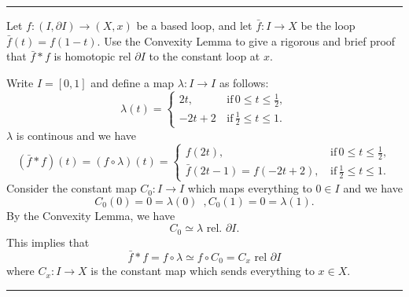 \documentclass[a4paper, 12pt]{article}
\begin{document}
\noindent\rule{7in}{2.8pt}

\begin{problem}{2}
Let \(f:(I,\partial I)\rightarrow (X,x)\) be a based loop, and let \(\bar{f}:I\rightarrow X\) be the loop \(\bar{f}(t)=f(1-t)\). Use the Convexity Lemma to give a rigorous and brief proof that 
\(\bar{f}*f\) is homotopic rel \(\partial I\) to the constant loop at \(x\).
\end{problem}
\begin{solution}
Write \(I=[0,1]\) and define a map \(\lambda:I\rightarrow I\) as follows:
\[\lambda(t)=\begin{cases}
    2t,&\, \text{if}\, 0\leq t\leq \frac{1}{2},\\ 
    -2t+2&\, \text{if}\, \frac{1}{2}\leq t\leq 1.
\end{cases}\]
\(\lambda\) is continous and we have
\[(\bar{f}*f)(t)=(f\circ \lambda)(t)=\begin{cases}
    f(2t),&\, \text{if}\, 0\leq t\leq \frac{1}{2},\\ 
    \bar{f}(2t-1)=f(-2t+2),&\, \text{if}\, \frac{1}{2}\leq t\leq 1.
\end{cases}\]
Consider the constant map \(C_0:I\rightarrow I\) which maps everything to \(0\in I\) and we have 
\[C_0(0)=0=\lambda(0)\,\,\, ,C_0(1)=0=\lambda(1).\]
By the Convexity Lemma, we have 
\[C_0\simeq \lambda\,\, \text{rel.}\,\, \partial I.\]
This implies that 
\[\bar{f}*f=f\circ \lambda\simeq f\circ C_0=C_x\,\, \text{rel}\,\, \partial I\]
where \(C_x:I\rightarrow X\) is the constant map which sends everything to \(x\in X\). 
\end{solution}

\noindent\rule{7in}{2.8pt}
\end{document}
